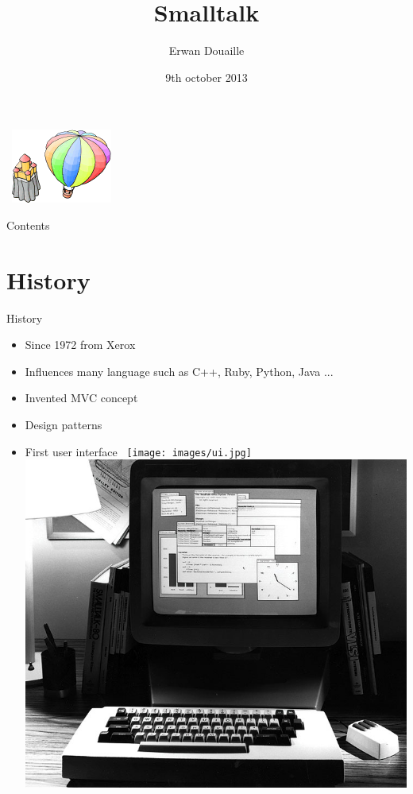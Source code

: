 \documentclass[12pt]{beamer}
\title[Smalltalk]{Smalltalk}
\author[Erwan Douaille]{Erwan Douaille}
\institute{University of Lille 1}
\date{9th october 2013}
\begin{document}
\begin{frame} 
	\vbox{
		\vspace*{0cm}
		\hbox{ 
     		\hspace*{8cm}
			\includegraphics[scale=0.4]{images/byteBalloon.png}
		}
	}
	\titlepage
\end{frame}

\begin{frame}{Contents}
	\tableofcontents[]
\end{frame}      


\section{History}
\begin{frame}{History}
	\begin{itemize}
		\item Since 1972 from Xerox
		\item Influences many language such as C++, Ruby, Python, Java ...
		\item Invented MVC concept
		\item Design patterns
		\item First user interface
		\hbox{ 
     		\hspace*{-1cm}
			\texttt{[image: images/ui.jpg]}
     		\hspace*{1cm}
			\includegraphics[scale=0.2]{images/compuer.jpg}
		}
	\end{itemize}
\end{frame}
\end{document}
